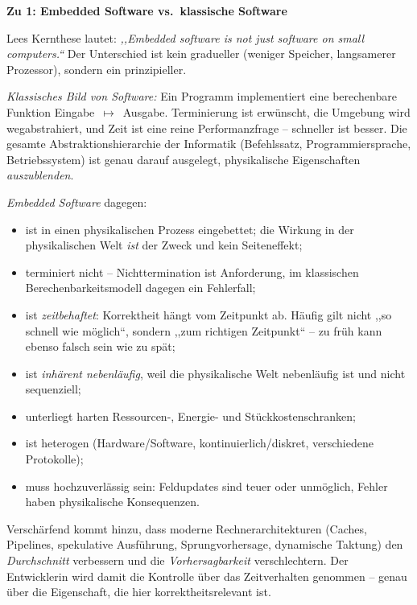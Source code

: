 \begin{loesung}
\textbf{Zu 1: Embedded Software vs.\ klassische Software}

Lees Kernthese lautet: \emph{,,Embedded software is not just software on small computers.``} Der
Unterschied ist kein gradueller (weniger Speicher, langsamerer Prozessor), sondern ein prinzipieller.

\emph{Klassisches Bild von Software:} Ein Programm implementiert eine berechenbare Funktion
Eingabe~$\mapsto$~Ausgabe. Terminierung ist erwünscht, die Umgebung wird wegabstrahiert, und Zeit ist
eine reine Performanzfrage -- schneller ist besser. Die gesamte Abstraktionshierarchie der Informatik
(Befehlssatz, Programmiersprache, Betriebssystem) ist genau darauf ausgelegt, physikalische
Eigenschaften \emph{auszublenden}.

\emph{Embedded Software} dagegen:
\begin{itemize}
    \item ist in einen physikalischen Prozess eingebettet; die Wirkung in der physikalischen Welt
          \emph{ist} der Zweck und kein Seiteneffekt;
    \item terminiert nicht -- Nichttermination ist Anforderung, im klassischen Berechenbarkeitsmodell
          dagegen ein Fehlerfall;
    \item ist \emph{zeitbehaftet}: Korrektheit hängt vom Zeitpunkt ab. Häufig gilt nicht ,,so schnell
          wie möglich``, sondern ,,zum richtigen Zeitpunkt`` -- zu früh kann ebenso falsch sein wie
          zu spät;
    \item ist \emph{inhärent nebenläufig}, weil die physikalische Welt nebenläufig ist und nicht
          sequenziell;
    \item unterliegt harten Ressourcen-, Energie- und Stückkostenschranken;
    \item ist heterogen (Hardware/Software, kontinuierlich/diskret, verschiedene Protokolle);
    \item muss hochzuverlässig sein: Feldupdates sind teuer oder unmöglich, Fehler haben
          physikalische Konsequenzen.
\end{itemize}
Verschärfend kommt hinzu, dass moderne Rechnerarchitekturen (Caches, Pipelines, spekulative
Ausführung, Sprungvorhersage, dynamische Taktung) den \emph{Durchschnitt} verbessern und die
\emph{Vorhersagbarkeit} verschlechtern. Der Entwicklerin wird damit die Kontrolle über das
Zeitverhalten genommen -- genau über die Eigenschaft, die hier korrektheitsrelevant ist.


\end{loesung}
